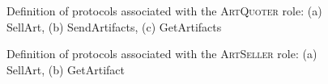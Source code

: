 \documentclass[paper=letter, fontsize=12pt]{article}
\begin{document}
\begin{figure}[H]
  \begin{center}
    \caption{Definition of protocols associated with the \textsc{ArtQuoter} role: \fontfamily{\sfdefault}\selectfont (a) SellArt, (b) SendArtifacts, (c) GetArtifacts}
    \label{fig:aq_protocol}
  \end{center}
\end{figure}
\begin{figure}[H]
  \begin{center}
    \caption{Definition of protocols associated with the \textsc{ArtSeller} role: \fontfamily{\sfdefault}\selectfont (a) SellArt, (b) GetArtifact}
    \label{fig:as_protocol}
  \end{center}
\end{figure}
\end{document}
